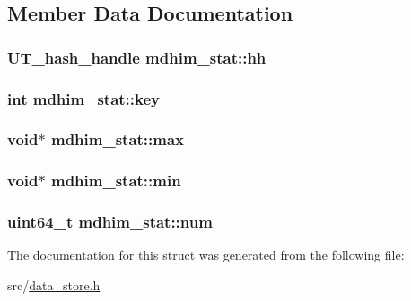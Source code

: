 \subsection{Member Data Documentation}
\hypertarget{structmdhim__stat_a7efece810db77a787513ba5577800d7a}{
\subsubsection[{hh}]{\setlength{\rightskip}{0pt plus 5cm}U\-T\-\_\-hash\-\_\-handle mdhim\-\_\-stat\-::hh}}\label{structmdhim__stat_a7efece810db77a787513ba5577800d7a}
\hypertarget{structmdhim__stat_a8257aee706371a50726235fcb5d1cb6c}{
\subsubsection[{key}]{\setlength{\rightskip}{0pt plus 5cm}int mdhim\-\_\-stat\-::key}}\label{structmdhim__stat_a8257aee706371a50726235fcb5d1cb6c}
\hypertarget{structmdhim__stat_ae563344828e5e734dc924d6192f5fde4}{
\subsubsection[{max}]{\setlength{\rightskip}{0pt plus 5cm}void$\ast$ mdhim\-\_\-stat\-::max}}\label{structmdhim__stat_ae563344828e5e734dc924d6192f5fde4}
\hypertarget{structmdhim__stat_a66250dbd1b7be13842e4679ca46513b0}{
\subsubsection[{min}]{\setlength{\rightskip}{0pt plus 5cm}void$\ast$ mdhim\-\_\-stat\-::min}}\label{structmdhim__stat_a66250dbd1b7be13842e4679ca46513b0}
\hypertarget{structmdhim__stat_a0630c9382b160becabc1eef79cedb95c}{
\subsubsection[{num}]{\setlength{\rightskip}{0pt plus 5cm}uint64\-\_\-t mdhim\-\_\-stat\-::num}}\label{structmdhim__stat_a0630c9382b160becabc1eef79cedb95c}


The documentation for this struct was generated from the following file\-:\begin{DoxyCompactItemize}
\item 
src/\hyperlink{data__store_8h}{data\-\_\-store.\-h}\end{DoxyCompactItemize}
